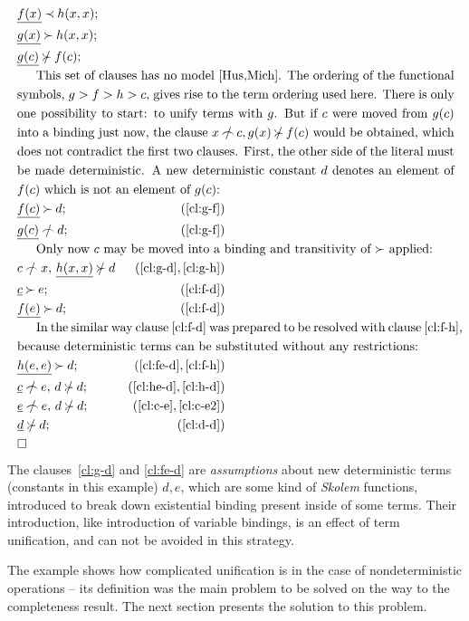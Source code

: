 \begin{EXAMPLE} \label{famous}
\begin{eqnarray}
\label{cl:f-h}  &\underline{f(x)}\Incl h(x,x); \\
\label{cl:g-h}  &\underline{g(x)}\Cont h(x,x);\\
\label{cl:g-f}  &\underline{g(c)}\notCont f(c);\\
\noalign
{This set of clauses has no model \cite{Hus,Mich}.  The ordering of 
the functional symbols, $g>f>h>c$, gives rise to the term ordering used here.
There is only one possibility to start: to unify terms with
$g$. But if $c$ were moved from $g(c)$ into a binding just now, the clause
\(x\notInt c, g(x)\notCont f(c)\) would be obtained, which does not
contradict the first two clauses.  First, the other side of the literal
must be made deterministic. A new deterministic constant $d$ denotes an element
of $f(c)$ which is not an element of $g(c)$:}
\label{cl:f-d}  &\underline{f(c)}\Cont d; &  (\ref {cl:g-f})\\
\label{cl:g-d}  &\underline{g(c)}\notInt d; &  (\ref {cl:g-f})\\
\noalign{Only now $c$ may be moved into a binding and transitivity of 
$\Cont$ applied:}
\label{cl:h-d}  & c\notInt x,\,\underline{h(x,x)}\notCont d &  (\ref{cl:g-d},\ref{cl:g-h})\\
\label{cl:c-e}   &\underline c\Cont e; &  (\ref {cl:f-d})\\
\label{cl:fe-d}   &\underline{f(e)}\Cont d; &  (\ref {cl:f-d})\\
\noalign{In the similar way clause~\ref {cl:f-d} was prepared to be resolved
with clause~\ref {cl:f-h}, because deterministic terms can be substituted
without any restrictions:}
\label{cl:he-d}  &\underline{h(e,e)}\Cont d;\quad &  (\ref {cl:fe-d},\ref{cl:f-h})\\
\label{cl:c-e2}  & \underline c\notInt e,\, d\notCont d; &  (\ref {cl:he-d},\ref{cl:h-d})\\
\label{cl:d-d}   & \underline e\notInt e,\,d\notCont d; &  (\ref {cl:c-e},\ref{cl:c-e2})\\
&\underline{d}\notCont d; &  (\ref {cl:d-d})\\
& \Box \vspace{-2ex}
\end{eqnarray}
The clauses~\ref {cl:g-d} and \ref{cl:fe-d} are {\em assumptions} about new
deterministic terms (constants in this example) $d,e$, which are some kind of
{\em Skolem} functions, introduced to break down existential binding present
inside of some terms.  Their introduction, like introduction of variable
bindings, is an effect of term unification, and can not be avoided in this
strategy.
\end{EXAMPLE}
%
The example shows how complicated unification is in the case of
nondeterministic operations -- its definition was the
main problem to be solved on the way to the completeness result. The
next section presents the solution to this problem.

